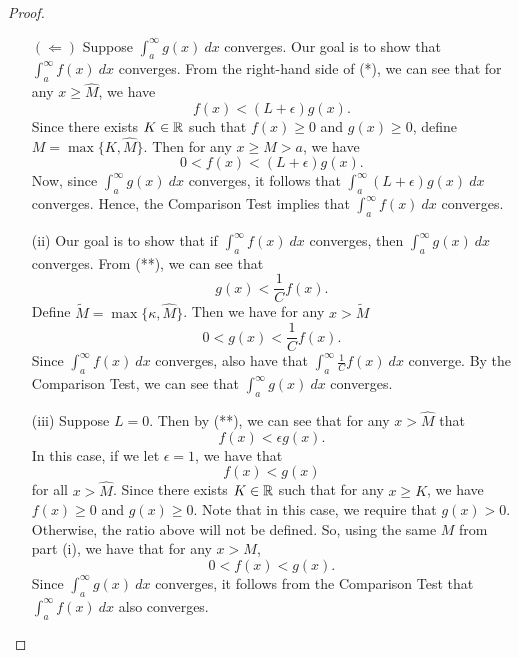 \documentclass[a4paper]{article}
\begin{document}
\begin{proof}
\begin{enumerate}
           \( (\Longleftarrow) \) Suppose \( \int_{ a }^{ \infty  } g(x) \ dx  \) converges. Our goal is to show that \( \int_{ a }^{ \infty  } f(x) \ dx  \) converges. From the right-hand side of (*), we can see that for any \( x \geq \hat{M} \), we have 
           \[  f(x) < (L+\epsilon) g(x). \]
           Since there exists \( K \in \mathbb{R}  \) such that \( f(x) \geq 0  \) and \( g(x) \geq 0 \), define \( M = \max \{ K, \hat{M} \}  \). Then for any \( x \geq M > a   \), we have  
    \[  0 < f(x) < (L+ \epsilon) g(x). \]
    Now, since \( \int_{ a }^{ \infty  } g(x) \ dx  \) converges, it follows that \( \int_{ a }^{ \infty  } (L+\epsilon) g(x) \ dx  \) converges. Hence, the Comparison Test implies that \( \int_{ a }^{ \infty  } f(x) \ dx  \) converges.
    \item[(ii)] Our goal is to show that if \( \int_{ a }^{ \infty  }  f(x) \ dx  \) converges, then \( \int_{ a }^{ \infty  } g(x) \ dx  \) converges. From (**), we can see that     
        \[  g(x) < \frac{ 1 }{ C }  f(x).  \]
        Define \( \tilde{M} = \max \{ \kappa, \hat{M} \}  \). Then we have for any \( x > \tilde{M} \)
        \[  0 < g(x) < \frac{ 1 }{ C  }  f(x). \]
    Since \( \int_{ a }^{ \infty  } f(x) \ dx  \) converges, also have that \( \int_{ a }^{ \infty  } \frac{ 1 }{ C } f(x) \ dx  \) converge. By the Comparison Test, we can see that \( \int_{ a }^{ \infty  } g(x) \ dx  \) converges.
\item[(iii)] Suppose \( L = 0   \). Then by (**), we can see that for any \( x > \hat{M} \) that 
    \[  f(x) < \epsilon g(x). \]
    In this case, if we let \( \epsilon = 1  \), we have that 
    \[  f(x) < g(x) \] for all \( x > \hat{M} \). Since there exists \( K \in \mathbb{R}   \) such that for any \( x \geq K  \), we have \( f(x) \geq 0  \) and \( g(x) \geq 0 \). Note that in this case, we require that \( g(x) > 0  \). Otherwise, the ratio above will not be defined. So, using the same \(  M   \) from part (i), we have that for any \(x > M  \),  
    \[  0 < f(x) < g(x).  \]
    Since \( \int_{ a }^{ \infty  } g(x) \ dx  \) converges, it follows from the Comparison Test that \( \int_{ a }^{ \infty  } f(x) \ dx  \) also converges.
    \end{enumerate}
\end{proof}
\end{document}
